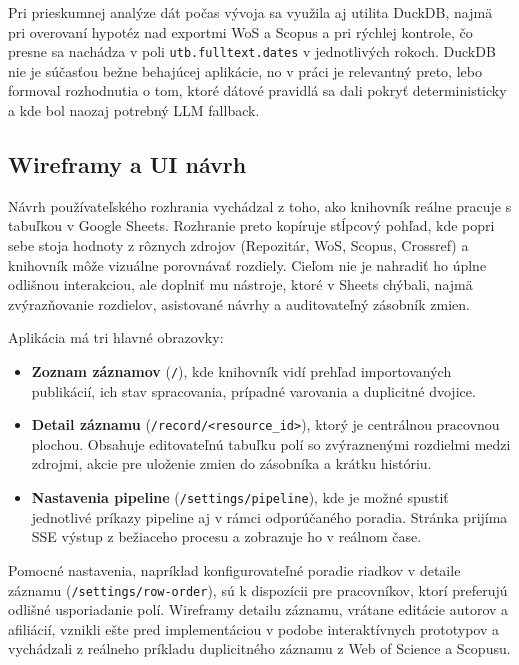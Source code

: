 Pri prieskumnej analýze dát počas vývoja sa využila aj utilita DuckDB, najmä pri overovaní hypotéz nad exportmi WoS a Scopus a pri rýchlej kontrole, čo presne sa nachádza v poli \texttt{utb.fulltext.dates} v jednotlivých rokoch. DuckDB nie je súčasťou bežne behajúcej aplikácie, no v práci je relevantný preto, lebo formoval rozhodnutia o tom, ktoré dátové pravidlá sa dali pokryť deterministicky a kde bol naozaj potrebný LLM fallback.

\subsection{Wireframy a UI návrh}

Návrh používateľského rozhrania vychádzal z toho, ako knihovník reálne pracuje s tabuľkou v Google Sheets. Rozhranie preto kopíruje stĺpcový pohľad, kde popri sebe stoja hodnoty z rôznych zdrojov (Repozitár, WoS, Scopus, Crossref) a knihovník môže vizuálne porovnávať rozdiely. Cieľom nie je nahradiť ho úplne odlišnou interakciou, ale doplniť mu nástroje, ktoré v Sheets chýbali, najmä zvýrazňovanie rozdielov, asistované návrhy a auditovateľný zásobník zmien.

Aplikácia má tri hlavné obrazovky:

\begin{itemize}
    \item \textbf{Zoznam záznamov} (\texttt{/}), kde knihovník vidí prehľad importovaných publikácií, ich stav spracovania, prípadné varovania a duplicitné dvojice.
    \item \textbf{Detail záznamu} (\texttt{/record/<resource\_id>}), ktorý je centrálnou pracovnou plochou. Obsahuje editovateľnú tabuľku polí so zvýraznenými rozdielmi medzi zdrojmi, akcie pre uloženie zmien do zásobníka a krátku históriu.
    \item \textbf{Nastavenia pipeline} (\texttt{/settings/pipeline}), kde je možné spustiť jednotlivé príkazy pipeline aj v rámci odporúčaného poradia. Stránka prijíma SSE výstup z bežiaceho procesu a zobrazuje ho v reálnom čase.
\end{itemize}

Pomocné nastavenia, napríklad konfigurovateľné poradie riadkov v detaile záznamu (\texttt{/settings/row-order}), sú k dispozícii pre pracovníkov, ktorí preferujú odlišné usporiadanie polí. Wireframy detailu záznamu, vrátane editácie autorov a afiliácií, vznikli ešte pred implementáciou v podobe interaktívnych prototypov a vychádzali z reálneho príkladu duplicitného záznamu z Web of Science a Scopusu.
